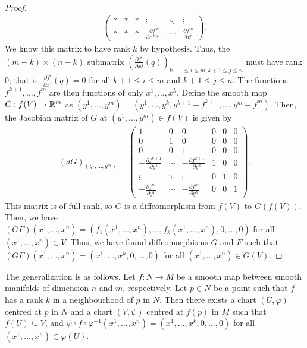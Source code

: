 \begin{proof}
\begin{align}
\begin{pmatrix}
            \ast & \ast & \ast & \vdots & \ddots & \vdots \\
            \ast & \ast & \ast & \frac{\partial f^{m}}{\partial x^{k+1}} & \cdots & \frac{\partial f^{m}}{\partial x^{n}}
        \end{pmatrix}.
    \end{align}
    We know this matrix to have rank $k$ by hypothesis. Thus, the $(m-k) \times (n-k)$ submatrix $\left(\frac{\partial f^{i}}{\partial x^{j}}(q)\right)_{k+1 \leq i \leq m, k+1 \leq j \leq n}$ must have rank $0$; that is, $\frac{\partial f^{i}}{\partial x^{j}}(q) = 0$ for all $k+1 \leq i \leq m$ and $k+1 \leq j \leq n$. The functions $f^{k+1},\ldots,f^{m}$ are then functions of only $x^{1},\ldots,x^{k}$. Define the smooth map $G:f(V) \to \mathbb{R}^{m}$ as $(y^{1},\ldots,y^{m}) = (y^{1},\ldots,y^{k},y^{k+1}-f^{k+1},\ldots,y^{m}-f^{m})$. Then, the Jacobian matrix of $G$ at $(y^{1},\ldots,y^{m}) \in f(V)$ is given by
    \begin{align}
        (dG)_{(y^{1},\ldots,y^{m})} = \begin{pmatrix}
            1 & 0 & 0 & 0 & 0 & 0 \\
            0 & 1 & 0 & 0 & 0 & 0 \\
            0 & 0 & 1 & 0 & 0 & 0 \\
            -\frac{\partial f^{k+1}}{\partial y^{1}} & \cdots & -\frac{\partial f^{k+1}}{\partial y^{k}} & 1 & 0 & 0 \\
            \vdots & \ddots & \vdots & 0 & 1 & 0 \\
            -\frac{\partial f^{m}}{\partial y^{1}} & \cdots & -\frac{\partial f^{m}}{\partial y^{k}} & 0 & 0 & 1
        \end{pmatrix}.
    \end{align}
    This matrix is of full rank, so $G$ is a diffeomorphism from $f(V)$ to $G(f(V))$. Then, we have $(GF)(x^{1},\ldots,x^{n}) = (f_{1}(x^{1},\ldots,x^{n}),\ldots,f_{k}(x^{1},\ldots,x^{n}),0,\ldots,0)$ for all $(x^{1},\ldots,x^{n}) \in V$. Thus, we have found diffeomorphisms $G$ and $F$ such that $(GF)(x^{1},\ldots,x^{n}) = (x^{1},\ldots,x^{k},0,\ldots,0)$ for all $(x^{1},\ldots,x^{n}) \in G(V)$.
\end{proof}

The generalization is as follows. Let $f:N \to M$ be a smooth map between smooth manifolds of dimension $n$ and $m$, respectively. Let $p \in N$ be a point such that $f$ has a rank $k$ in a neighbourhood of $p$ in $N$. Then there exists a chart $(U,\varphi)$ centred at $p$ in $N$ and a chart $(V,\psi)$ centred at $f(p)$ in $M$ such that $f(U) \subseteq V$, and $\psi \circ f \circ \varphi^{-1}(x^{1},\ldots,x^{n}) = (x^{1},\ldots,x^{k},0,\ldots,0)$ for all $(x^{1},\ldots,x^{n}) \in \varphi(U)$.
\\

